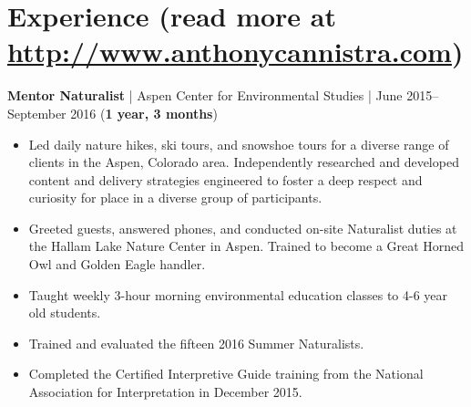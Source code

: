 \documentclass[10pt, letter]{article}
\begin{document}
\vspace{-15pt}
\section*{Experience \textnormal{\small (read more at \url{http://www.anthonycannistra.com})}}
{\bf Mentor Naturalist} | {Aspen Center for Environmental Studies} | June 2015--September 2016 (\textbf{1 year, 3 months})\\
\vspace*{-.15in}
\begin{itemize}[topsep=0pt,itemsep=-1pt]
  \item Led daily nature hikes, ski tours, and snowshoe tours for a diverse range of clients in the Aspen, Colorado area. Independently researched and developed content and delivery strategies engineered to foster a deep respect and curiosity for place in a diverse group of participants. 
  \item Greeted guests, answered phones, and conducted on-site Naturalist duties at the Hallam Lake Nature Center in Aspen. Trained to become a Great Horned Owl and Golden Eagle handler.
  \item Taught weekly 3-hour morning environmental education classes to 4-6 year old students.
  \item Trained and evaluated the fifteen 2016 Summer Naturalists.
  \item Completed the Certified Interpretive Guide training from the National Association for Interpretation in December 2015.
\end{itemize}
\end{document}
